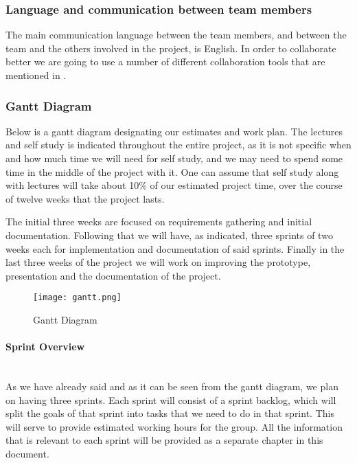 \documentclass[../document.tex]{subfiles}
\begin{document}
\subsubsection{Language and communication between team members}
The main communication language between the team members, and between the team and the others involved in the project, is English. In order to collaborate better we are going to use a number of different collaboration tools that are mentioned in .

\subsubsection{Gantt Diagram}
Below is a gantt diagram designating our estimates and work plan. The lectures and self study is indicated throughout the entire project, as it is not specific when and how much time we will need for self study, and we may need to spend some time in the middle of the project with it. One can assume that self study along with lectures will take about 10\% of our estimated project time, over the course of twelve weeks that the project lasts.

The initial three weeks are focused on requirements gathering and initial documentation. Following that we will have, as indicated, three sprints of two weeks each for implementation and documentation of said sprints. Finally in the last three weeks of the project we will work on improving the prototype, presentation and the documentation of the project.

\begin{figure}[H]
\centering
\texttt{[image: gantt.png]}
\caption{Gantt Diagram}
\end{figure}

\paragraph{Sprint Overview} \ \\
As we have already said and as it can be seen from the gantt diagram, we plan on having three sprints. Each sprint will consist of a sprint backlog, which will split the goals of that sprint into tasks that we need to do in that sprint. This will serve to provide estimated working hours for the group. All the information that is relevant to each sprint will be provided as a separate chapter in this document. 
\end{document}
